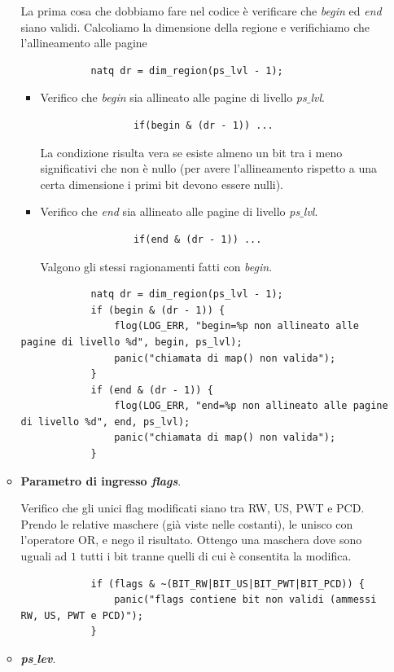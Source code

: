 \begin{itemize}
\begin{itemize}
		La prima cosa che dobbiamo fare nel codice è verificare che \emph{begin} ed \emph{end} siano validi. Calcoliamo la dimensione della regione e verifichiamo che l'allineamento alle pagine
		\begin{verbatim}
			natq dr = dim_region(ps_lvl - 1);
		\end{verbatim}
		\begin{itemize}
			\item  Verifico che \emph{begin} sia allineato alle pagine di livello \emph{ps$\_$lvl}.
			\begin{verbatim}
				if(begin & (dr - 1)) ...
			\end{verbatim}
			La condizione risulta vera se esiste almeno un bit tra i meno significativi che non è nullo (per avere l'allineamento rispetto a una certa dimensione i primi bit devono essere nulli).
			\item  Verifico che \emph{end} sia allineato alle pagine di livello \emph{ps$\_$lvl}. 
			\begin{verbatim}
				if(end & (dr - 1)) ...	\end{verbatim}
			Valgono gli stessi ragionamenti fatti con \emph{begin}.
		\end{itemize}
		\small
		\begin{verbatim}
			natq dr = dim_region(ps_lvl - 1);
			if (begin & (dr - 1)) {
				flog(LOG_ERR, "begin=%p non allineato alle pagine di livello %d", begin, ps_lvl);
				panic("chiamata di map() non valida");
			}
			if (end & (dr - 1)) {
				flog(LOG_ERR, "end=%p non allineato alle pagine di livello %d", end, ps_lvl);
				panic("chiamata di map() non valida");
			}
		\end{verbatim}
		\normalsize 
		\item \textbf{Parametro di ingresso \emph{flags}}. 
		
		\noindent Verifico che gli unici flag modificati siano tra RW, US, PWT e PCD. Prendo le relative maschere (già viste nelle costanti), le unisco con l'operatore OR, e nego il risultato. Ottengo una maschera dove sono uguali ad $1$ tutti i bit tranne quelli di cui è consentita la modifica.
		\small
		\begin{verbatim}
			if (flags & ~(BIT_RW|BIT_US|BIT_PWT|BIT_PCD)) {
				panic("flags contiene bit non validi (ammessi RW, US, PWT e PCD)");
			}
		\end{verbatim}
		\normalsize
		
		\item \textbf{\emph{ps$\_$lev}}.
		

\end{itemize}
\end{itemize}
